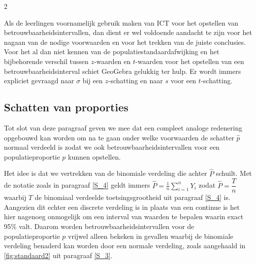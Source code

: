 \begin{multicols}{2}

Als de leerlingen voornamelijk gebruik maken van ICT voor het opstellen van betrouwbaarheidsintervallen, dan dient er wel voldoende aandacht te zijn voor het nagaan van de nodige voorwaarden en voor het trekken van de juiste conclusies. Voor het al dan niet kennen van de populatiestandaardafwijking en het bijbehorende verschil tussen $z$-waarden en $t$-waarden voor het opstellen van een betrouwbaarheidsinterval schiet GeoGebra gelukkig ter hulp. Er wordt immers expliciet gevraagd naar $\sigma$ bij een $z$-schatting en naar $s$ voor een $t$-schatting.

\subsection*{Schatten van proporties}






Tot slot van deze paragraaf geven we mee dat een compleet analoge redenering opgebouwd kan worden om na te gaan onder welke voorwaarden de schatter $\hat{p}$ normaal verdeeld is zodat we ook betrouwbaarheidsintervallen voor een populatieproportie $p$ kunnen opstellen. 

Het idee is dat we vertrekken van de binomiale verdeling die achter $\hat{P}$ schuilt. Met de notatie zoals in paragraaf \ref{S_4} geldt immers $\hat{P} = \displaystyle \frac1n \sum_{i=1}^n Y_i$ zodat $\hat{P} = \dfrac{T}{n}$ waarbij $T$ de binomiaal verdeelde toetsingsgrootheid uit paragraaf \ref{S_4} is. Aangezien dit echter een discrete verdeling is in plaats van een continue is het hier nagenoeg onmogelijk om een interval van waarden te bepalen waarin exact 95\% valt. Daarom worden betrouwbaarheidsintervallen voor de populatieproportie $p$ vrijwel alleen bekeken in gevallen waarbij de binomiale verdeling benaderd kan worden door een normale verdeling, zoals aangehaald in \autoref{fig:standaard2} uit paragraaf \ref{S_3}. 


\end{multicols}
